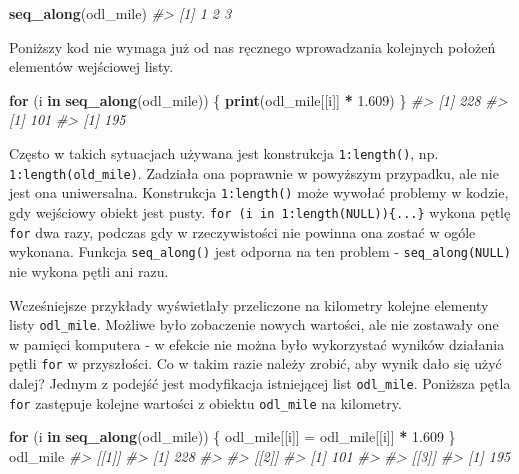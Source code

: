\documentclass[paper=6in:9in,pagesize=pdftex,headinclude=on,footinclude=on,10pt]{scrbook}
\makeatletter
\newenvironment{Shaded}{\begin{snugshade}}{\end{snugshade}}
\newcommand{\CommentTok}[1]{\textcolor[rgb]{0.56,0.35,0.01}{\textit{#1}}}
\newcommand{\ControlFlowTok}[1]{\textcolor[rgb]{0.13,0.29,0.53}{\textbf{#1}}}
\newcommand{\FloatTok}[1]{\textcolor[rgb]{0.00,0.00,0.81}{#1}}
\newcommand{\KeywordTok}[1]{\textcolor[rgb]{0.13,0.29,0.53}{\textbf{#1}}}
\newcommand{\NormalTok}[1]{#1}
\newcommand{\OperatorTok}[1]{\textcolor[rgb]{0.81,0.36,0.00}{\textbf{#1}}}
\newcommand{\StringTok}[1]{\textcolor[rgb]{0.31,0.60,0.02}{#1}}
\newenvironment{kframe}{%
\medskip{}
\setlength{\fboxsep}{.8em}
 \def\at@end@of@kframe{}%
 \ifinner\ifhmode%
  \def\at@end@of@kframe{\end{minipage}}%
  \begin{minipage}{\columnwidth}%
 \fi\fi%
 \def\FrameCommand##1{\hskip\@totalleftmargin \hskip-\fboxsep
 \colorbox{shadecolor}{##1}\hskip-\fboxsep
     \hskip-\linewidth \hskip-\@totalleftmargin \hskip\columnwidth}%
 \MakeFramed {\advance\hsize-\width
   \@totalleftmargin\z@ \linewidth\hsize
   \@setminipage}}%
 {\par\unskip\endMakeFramed%
 \at@end@of@kframe}
\newenvironment{rmdblock}[1]
  {
  \begin{itemize}
  \renewcommand{\labelitemi}{
    \raisebox{-.7\height}[0pt][0pt]{
      {\setkeys{Gin}{width=3em,keepaspectratio}\texttt{[image: images/\#1]}}
    }
  }
  \setlength{\fboxsep}{1em}
  \begin{kframe}
  \item
  }
  {
  \end{kframe}
  \end{itemize}
  }
\newenvironment{rmdinfo}
  {\begin{rmdblock}{compass}}
  {\end{rmdblock}}
\makeatother
\begin{document}
\begin{Shaded}
\begin{Highlighting}[]
\KeywordTok{seq_along}\NormalTok{(odl_mile)}
\CommentTok{#> [1] 1 2 3}
\end{Highlighting}
\end{Shaded}

Poniższy kod nie wymaga już od nas ręcznego wprowadzania kolejnych położeń elementów wejściowej listy.

\begin{Shaded}
\begin{Highlighting}[]
\ControlFlowTok{for}\NormalTok{ (i }\ControlFlowTok{in} \KeywordTok{seq_along}\NormalTok{(odl_mile)) \{}
  \KeywordTok{print}\NormalTok{(odl_mile[[i]] }\OperatorTok{*}\StringTok{ }\FloatTok{1.609}\NormalTok{)}
\NormalTok{\}}
\CommentTok{#> [1] 228}
\CommentTok{#> [1] 101}
\CommentTok{#> [1] 195}
\end{Highlighting}
\end{Shaded}

\begin{rmdinfo}
Często w takich sytuacjach używana jest konstrukcja \texttt{1:length()}, np. \texttt{1:length(old\_mile)}.
Zadziała ona poprawnie w powyższym przypadku, ale nie jest ona uniwersalna.
Konstrukcja \texttt{1:length()} może wywołać problemy w kodzie, gdy wejściowy obiekt jest pusty.
\texttt{for\ (i\ in\ 1:length(NULL))\{...\}} wykona pętlę \texttt{for} dwa razy, podczas gdy w rzeczywistości nie powinna ona zostać w ogóle wykonana.
Funkcja \texttt{seq\_along()} jest odporna na ten problem - \texttt{seq\_along(NULL)} nie wykona pętli ani razu.
\end{rmdinfo}

Wcześniejsze przykłady wyświetlały przeliczone na kilometry kolejne elementy listy \texttt{odl\_mile}.
Możliwe było zobaczenie nowych wartości, ale nie zostawały one w pamięci komputera - w efekcie nie można było wykorzystać wyników działania pętli \texttt{for} w przyszłości.
Co w takim razie należy zrobić, aby wynik dało się użyć dalej?
Jednym z podejść jest modyfikacja istniejącej list \texttt{odl\_mile}.
Poniższa pętla \texttt{for} zastępuje kolejne wartości z obiektu \texttt{odl\_mile} na kilometry.

\begin{Shaded}
\begin{Highlighting}[]
\ControlFlowTok{for}\NormalTok{ (i }\ControlFlowTok{in} \KeywordTok{seq_along}\NormalTok{(odl_mile)) \{}
\NormalTok{  odl_mile[[i]] =}\StringTok{ }\NormalTok{odl_mile[[i]] }\OperatorTok{*}\StringTok{ }\FloatTok{1.609}
\NormalTok{\}}
\NormalTok{odl_mile}
\CommentTok{#> [[1]]}
\CommentTok{#> [1] 228}
\CommentTok{#> }
\CommentTok{#> [[2]]}
\CommentTok{#> [1] 101}
\CommentTok{#> }
\CommentTok{#> [[3]]}
\CommentTok{#> [1] 195}
\end{Highlighting}
\end{Shaded}
\end{document}
